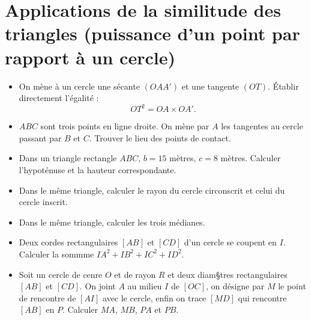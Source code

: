 \documentclass[12 pt]{report}
\theoremstyle{plain}
\newcounter{n}
\renewcommand{\it}{\item[$\mathbf{\then}.$]\stepcounter{n} }
\begin{document}
 \chapter{Applications de la similitude des triangles (puissance d'un point par rapport à un cercle)}
 \begin{itemize}
 \it On mène à un cercle une sécante $(OAA')$ et une tangente $(OT)$. 
 Établir directement l'égalité : \[ OT^2 = OA \times OA'.\]
 \it $ABC$ sont trois points en ligne droite. On mène par $A$ les tangentes au cercle passant par $B$ et $C$. Trouver le lieu des points de contact. 
 \it Dans un triangle rectangle $ABC$, $b=15$ mètres, $c= 8$ mètres. Calculer l'hypoténuse et la hauteur correspondante. 
 \it Dans le même triangle, calculer le rayon du cercle circonscrit et celui du cercle inscrit. 
 \it Dans le même triangle, calculer les trois médianes.
 \it Deux cordes rectangulaires $[AB]$ et $[CD]$ d'un cercle se coupent en $I$. Calculer la sommme $IA^2 +IB^2+IC^2+ID^2$. 
 \it Soit un cercle de cenre $O$ et de rayon $R$ et deux diam§tres rectangulaires $[AB]$ et $[CD]$. On joint $A$ au milieu $I$ de $[OC]$, on désigne par $M$ le point de rencontre de $[AI]$ avec le cercle, enfin on trace $[MD]$ qui rencontre $[AB]$ en $P$. Calculer $MA$, $MB$, $PA$ et $PB$. 
 

\end{itemize}
\end{document}
